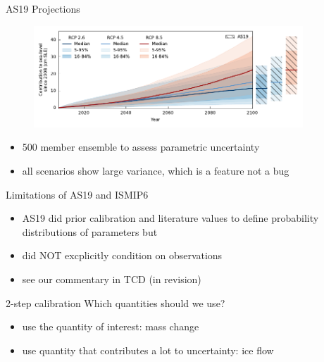 \documentclass[hide notes,intlimits]{beamer}
\begin{document}
\begin{frame}{AS19 Projections}
  \begin{figure}
    \includegraphics[width=0.9\textwidth]{projection_as19_bars}
  \end{figure}
\begin{itemize}
\item 500 member ensemble to assess parametric uncertainty
\item all scenarios show large variance, which is a feature not a bug
\end{itemize}
\note[item]{}
\end{frame}


\begin{frame}{Limitations of AS19 and ISMIP6}
  \begin{figure}
  \end{figure}
\begin{itemize}
\item AS19 did prior calibration and literature values to define probability distributions of parameters \alert{but}
\item did \alert{NOT} excplicitly condition on observations
\item see our commentary in TCD (in revision)
\end{itemize}
\note[item]{}
\end{frame}

\begin{frame}{2-step calibration}
Which quantities should we use?
\begin{itemize}
\item use the quantity of interest: mass change
\item use quantity that contributes a lot to uncertainty: ice flow
\end{itemize}
\note[item]{}
\end{frame}
\end{document}
